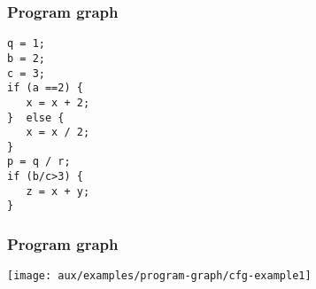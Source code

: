 \begin{frame}[hasprev=false, hasnext=true, fragile]
\label{example:program-graph}
\frametitle{Program graph}

\begin{lstlisting}
q = 1;
b = 2;
c = 3;
if (a ==2) {
   x = x + 2;
}  else {
   x = x / 2;
}
p = q / r;
if (b/c>3) {
   z = x + y;
}
\end{lstlisting}
\end{frame}


\begin{frame}[hasprev=true, hasnext=false, c]
\frametitle{Program graph}

\texttt{[image: aux/examples/program-graph/cfg-example1]}

\end{frame}
